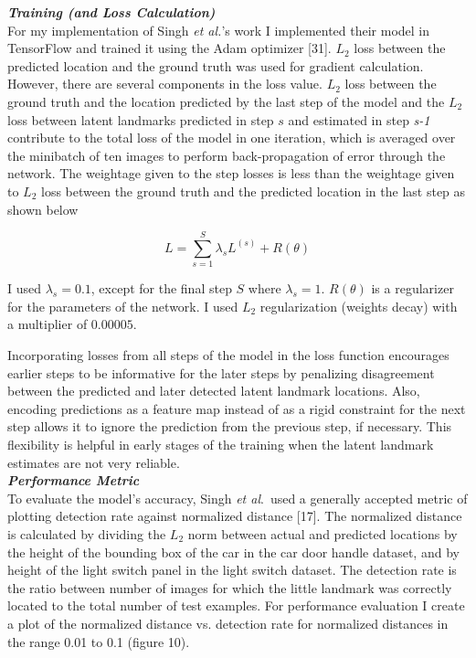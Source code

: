 \documentclass [11pt,letterpaper ,twoside ,openany ]{report}
\begin{document}
    \noindent
    \textbf{\textit{Training (and Loss Calculation)}}\\
    For my implementation of Singh \textit{et al.}'s work I implemented their model in TensorFlow and trained it using the Adam optimizer [31]. \(L_2\) loss between the predicted location and the ground truth was used for gradient calculation. However, there are several components in the loss value. \(L_2\) loss between the ground truth and the location predicted by the last step of the model and the \(L_2\) loss between latent landmarks predicted in step \(s\) and estimated in step \textit {s-1} contribute to the total loss of the model in one iteration, which is averaged over the minibatch of ten images to perform back-propagation of error through the network. The weightage given to the step losses is less than the weightage given to \(L_2\) loss between the ground truth and the predicted location in the last step as shown below

    \[ L =  \displaystyle\sum_{s=1}^{S} \lambda _s L^{(s)} + R(\theta)\]

    \noindent
    I used \( \lambda _s = 0.1 \), except for the final step \(S\) where \( \lambda _s = 1\).  \( R(\theta) \) is a regularizer for the parameters of the network. I used \(L_2\) regularization (weights decay) with a multiplier of \(0.00005\). 
        
    Incorporating losses from all steps of the model in the loss function encourages earlier steps to be informative for the later steps by penalizing disagreement between the predicted and later detected latent landmark locations. Also, encoding predictions as a feature map instead of as a rigid constraint for the next step allows it to ignore the prediction from the previous step, if necessary. This flexibility is helpful in early stages of the training when the latent landmark estimates are not very reliable.\\

    \noindent
    \textbf{\textit{Performance Metric}}\\
    To evaluate the model's accuracy, Singh \textit{et al}.\ used a generally accepted metric of plotting detection rate against normalized distance  [17]. The normalized distance is calculated by dividing the \(L_2\) norm between actual and predicted locations by the height of the bounding box of the car in the car door handle dataset,  and by height of the light switch panel in the light switch dataset. The detection rate is the ratio between number of images for which the little landmark was correctly located to the total number of test examples. For performance evaluation I create a plot of the normalized distance vs. detection rate for normalized distances in the range 0.01 to 0.1 (figure 10).
\end{document}
